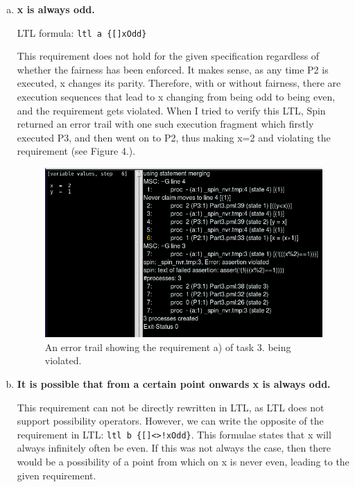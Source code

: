 \documentclass{report}
\begin{document}
\begin{enumerate}[(a)]
\item \textbf{x is always odd.}

LTL formula: \texttt{ltl a \{[]xOdd\}}

This requirement does not hold for the given specification regardless of whether the fairness has been enforced. It makes sense, as any time P2 is executed, x changes its parity. Therefore, with or without fairness, there are execution sequences that lead to x changing from being odd to being even, and the requirement gets violated. When I tried to verify this LTL, Spin returned an error trail with one such execution fragment which firstly executed P3, and then went on to P2, thus making x=2 and violating the requirement (see Figure 4.).

\begin{figure} [\textwidth]
\hspace{0cm}
\includegraphics[scale=0.7]{Images/ltlA.png}
\caption{An error trail showing the requirement a) of task 3. being violated.}
\end{figure}

\item \textbf{It is possible that from a certain point onwards x is always odd.}

This requirement can not be directly rewritten in LTL, as LTL does not support possibility operators. However, we can write the opposite of the requirement in LTL: \texttt{ltl b \{[]<>!xOdd\}}. This formulae states that x will always infinitely often be even. If this was not always the case, then there would be a possibility of a point from which on x is never even, leading to the given requirement.


\end{enumerate}
\end{document}
